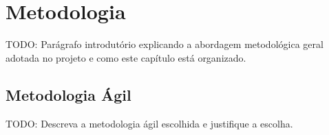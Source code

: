 %
%

\chapter{Metodologia}
\label{cap:metodologia}

TODO: Parágrafo introdutório explicando a abordagem metodológica geral
adotada no projeto e como este capítulo está organizado.


\section{Metodologia Ágil}
\label{sec:metodologia-agil}

TODO: Descreva a metodologia ágil escolhida e justifique a escolha.

%


